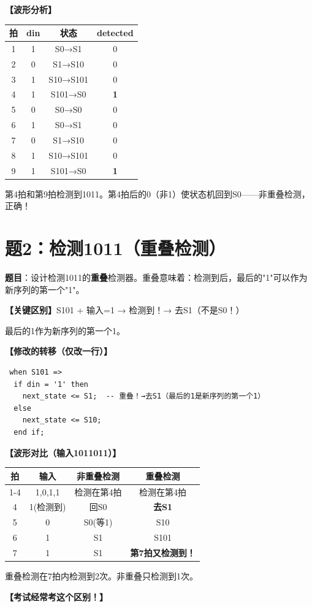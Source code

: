 \begin{solution}[完整解答]
\textbf{【波形分析】}
\begin{center}
\begin{tabular}{|c|c|c|c|}\hline
拍 & din & 状态 & detected \\ \hline
1 & 1 & S0→S1 & 0 \\ \hline 2 & 0 & S1→S10 & 0 \\ \hline
3 & 1 & S10→S101 & 0 \\ \hline 4 & 1 & S101→S0 & \textbf{1} \\ \hline
5 & 0 & S0→S0 & 0 \\ \hline 6 & 1 & S0→S1 & 0 \\ \hline
7 & 0 & S1→S10 & 0 \\ \hline 8 & 1 & S10→S101 & 0 \\ \hline
9 & 1 & S101→S0 & \textbf{1} \\ \hline
\end{tabular}
\end{center}
第4拍和第9拍检测到1011。第4拍后的0（非1）使状态机回到S0——非重叠检测，正确！

\end{solution}


\section{题2：检测1011（重叠检测）}

\textbf{题目}：设计检测1011的\textbf{重叠}检测器。重叠意味着：检测到后，最后的"1"可以作为新序列的第一个"1"。

\begin{solution}[完整解答]

\textbf{【关键区别】}S101 + 输入=1 → 检测到！→ 去S1（不是S0！）

最后的1作为新序列的第一个1。

\textbf{【修改的转移（仅改一行）】}
\begin{lstlisting}
 when S101 =>
  if din = '1' then
    next_state <= S1;  -- 重叠！→去S1（最后的1是新序列的第一个1）
  else
    next_state <= S10;
  end if;
\end{lstlisting}

\textbf{【波形对比（输入1011011）】}
\begin{center}
\begin{tabular}{|c|c|c|c|}\hline
拍 & 输入 & 非重叠检测 & 重叠检测 \\ \hline
1-4 & 1,0,1,1 & 检测在第4拍 & 检测在第4拍 \\ \hline
4 & 1(检测到) & 回S0 & \textbf{去S1} \\ \hline
5 & 0 & S0(等1) & S10 \\ \hline
6 & 1 & S1 & S101 \\ \hline
7 & 1 & S1 & \textbf{第7拍又检测到！}\\ \hline
\end{tabular}
\end{center}

重叠检测在7拍内检测到2次。非重叠只检测到1次。

\textbf{【考试经常考这个区别！】}

\end{solution}


